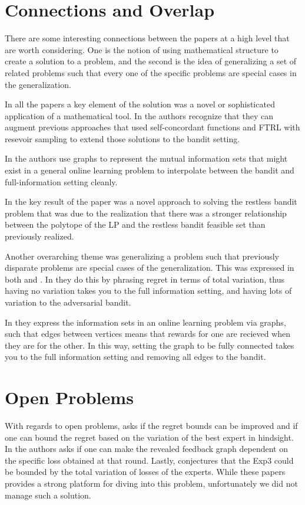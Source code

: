 \section{Connections and Overlap}
There are some interesting connections between the papers at a high level that are worth considering. One is the notion of using mathematical structure to create a solution to a problem, and the second is the idea of generalizing a set of related problems such that
every one of the specific problems are special cases in the generalization.

In all the papers a key element of the solution was a novel or sophisticated application of a mathematical tool. In \citep{hazan} the authors recognize that they can augment previous approaches that used self-concordant functions and FTRL with resevoir sampling to extend those solutions to the bandit setting.

In \citep{alon} the authors use graphs to represent the mutual information sets that might exist in a general online learning problem to interpolate between the bandit and full-information setting cleanly.

In \citep{bertsimas} the key result of the paper was a novel approach to solving the restless bandit problem that was due to the realization that there was a stronger relationship between the polytope of the LP and the restless bandit feasible set than previously realized.

Another overarching theme was generalizing a problem such that previously disparate problems are special cases of the generalization. This was expressed in both \citep{hazan} and \citep{alon}. In \citep{hazan} they do this by phrasing regret in terms of total variation, thus having no variation takes you to the full information setting, and having lots of variation to the adversarial bandit. 

In \citep{alon} they express the information sets in an online learning problem via graphs, such that edges between vertices means that rewards for one are recieved when they are for the other. In this way, setting the graph to be fully connected takes you to the full information setting and removing all edges to the bandit.

\section{Open Problems}
With regards to open problems, \citep{hazan} asks if the regret bounds can be improved and if one can bound the regret based on the variation of the best expert in hindsight. In \citep{alon} the authors asks if one can make the revealed feedback graph dependent on the specific loss obtained at that round. Lastly, \citep{abernethy} conjectures that the Exp3 could be bounded by the total variation of losses of the experts. While these papers provides a strong platform for diving into this problem, unfortunately we did not manage such a solution. 